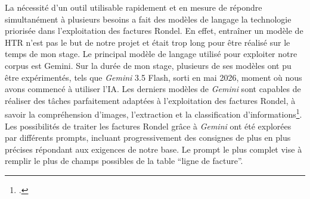 La nécessité d'un outil utilisable rapidement et en mesure de répondre simultanément à plusieurs besoins a fait des modèles de langage la technologie priorisée dans l'exploitation des factures Rondel. En effet, entraîner un modèle de HTR n'est pas le but de notre projet et était trop long pour être réalisé sur le temps de mon stage. Le principal modèle de langage utilisé pour exploiter notre corpus est Gemini. Sur la durée de mon stage, plusieurs de ses modèles ont pu être expérimentés, tels que \emph{Gemini} 3.5 Flash, sorti en mai 2026, moment où nous avons commencé à utiliser l'IA. Les derniers modèles de \emph{Gemini} sont capables de réaliser des tâches parfaitement adaptées à l'exploitation des factures Rondel, à savoir la compréhension d'images, l'extraction et la classification d'informations\footcite{noauthor_liste_nodate}.
Les possibilités de traiter les factures Rondel grâce à \emph{Gemini} ont été explorées par différents prompts, incluant progressivement des consignes de plus en plus précises répondant aux exigences de notre base. Le prompt le plus complet vise à remplir le plus de champs possibles de la table \enquote{ligne de facture}. 

